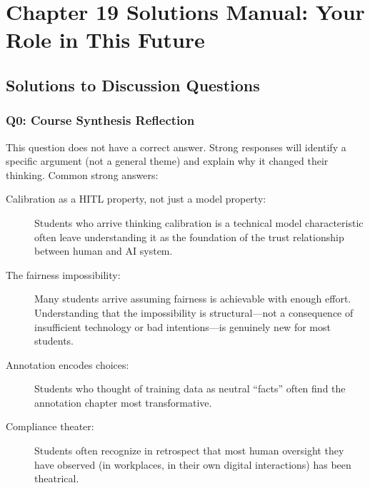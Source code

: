 
\section*{Chapter 19 Solutions Manual: Your Role in This Future}

\subsection*{Solutions to Discussion Questions}

\subsubsection*{Q0: Course Synthesis Reflection}

This question does not have a correct answer. Strong responses will identify a specific argument (not a general theme) and explain why it changed their thinking. Common strong answers:

\begin{description}
    \item[Calibration as a HITL property, not just a model property:] Students who arrive thinking calibration is a technical model characteristic often leave understanding it as the foundation of the trust relationship between human and AI system.
    \item[The fairness impossibility:] Many students arrive assuming fairness is achievable with enough effort. Understanding that the impossibility is structural---not a consequence of insufficient technology or bad intentions---is genuinely new for most students.
    \item[Annotation encodes choices:] Students who thought of training data as neutral ``facts'' often find the annotation chapter most transformative.
    \item[Compliance theater:] Students often recognize in retrospect that most human oversight they have observed (in workplaces, in their own digital interactions) has been theatrical.
\end{description}

